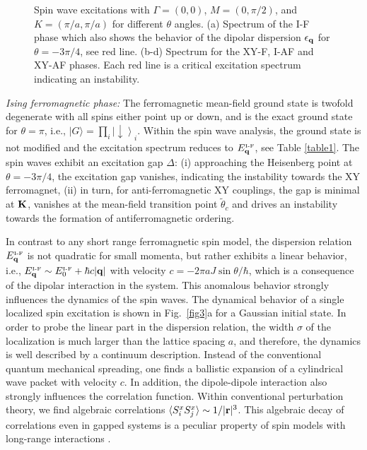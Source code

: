 \begin{figure}[ht]
  \caption{Spin wave excitations with $\Gamma=(0,0)$, $M=(0,\pi/2)$, and $K=(\pi/a,\pi/a)$ for different $\theta$ angles. (a) Spectrum of the I-F phase which also shows the behavior of the dipolar dispersion $\epsilon_{\bf q}$ for $\theta=-3\pi/4$, see red line.
(b-d) Spectrum for the XY-F, I-AF and XY-AF phases. Each red line is a critical excitation spectrum indicating an instability.
  }\label{fig2}
\end{figure}




{\it Ising ferromagnetic phase:}
The ferromagnetic mean-field ground state is twofold degenerate with all spins
either point up or down, and is the exact ground state for $\theta =
\pi$, i.e., $|G\rangle = \prod_{i} \left|\downarrow \right\rangle_{i}$. Within the spin wave analysis,
the ground state is not modified and the excitation
spectrum reduces to $E_{{\bf q}}^{\mbox{\tiny I-F}}$, see Table \ref{table1}.
The spin waves exhibit an excitation gap $\Delta$: (i) approaching the
Heisenberg point at  $\theta = -3 \pi /4$, the excitation gap
vanishes, indicating the instability towards the XY ferromagnet, (ii) in
turn, for anti-ferromagnetic XY couplings, the gap is minimal at  ${\bf K}$,
vanishes at the mean-field transition point $\tilde{\theta}_{c}$ and drives an instability towards the formation
of antiferromagnetic ordering.

In contrast to any short range ferromagnetic spin model, the
dispersion relation  $E_{{\bf q}}^{\mbox{\tiny I-F}}$ is not quadratic for small momenta,
but rather exhibits a linear behavior, i.e., $E_{{\bf q}}^{\mbox{\tiny I-F}}   \sim  E_{0}^{\mbox{\tiny I-F}}+ \hbar c |{\bf q}|$ with
velocity $c=  - 2 \pi a J \sin \theta  /\hbar$, which is a consequence of the dipolar interaction in
the system.  This anomalous behavior strongly influences the dynamics
of the spin waves.
The dynamical behavior of a single localized spin excitation is shown in Fig.~\ref{fig3}a for a Gaussian initial state.
In order to probe the linear part in the dispersion relation, the width $\sigma$
of the localization is much larger than the lattice spacing $a$, and therefore, the dynamics is
well described by a continuum description.
Instead of the conventional quantum mechanical spreading, one finds
a ballistic expansion of a cylindrical wave packet with velocity $c$.
In addition, the dipole-dipole interaction also strongly influences the correlation function.
Within conventional perturbation theory, we find algebraic correlations $\langle S_{i}^{x} S_{j}^{x}\rangle \sim 1/|{\bf r}|^3$.
This algebraic decay of correlations even in gapped systems is a peculiar property of
spin models with long-range interactions  \cite{deng05,schuch06}.



